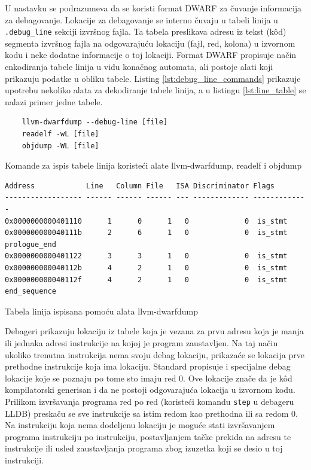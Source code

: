 \documentclass[12pt,oneside]{memoir}
\begin{document}
U nastavku se podrazumeva da se koristi format DWARF za čuvanje informacija za debagovanje.
Lokacije za debagovanje se interno čuvaju u tabeli linija u \verb|.debug_line| sekciji izvršnog fajla.
Ta tabela preslikava adresu iz tekst (k\^od) segmenta izvršnog fajla na odgovarajuću lokaciju (fajl, red, kolona) u izvornom kodu i neke dodatne informacije o toj lokaciji.
Format DWARF propisuje način enkodiranja tabele linija u vidu konačnog automata, ali postoje alati koji prikazuju podatke u obliku tabele.
Listing \ref{lst:debug_line_commands} prikazuje upotrebu nekoliko alata za dekodiranje tabele linija, a u listingu \ref{lst:line_table} se nalazi primer jedne tabele.

\begin{listing}[!ht]
  \begin{verbatim}
    llvm-dwarfdump --debug-line [file]
    readelf -wL [file]
    objdump -WL [file]
  \end{verbatim}
  \caption{Komande za ispis tabele linija koristeći alate llvm-dwarfdump, readelf i objdump}
  \label{lst:debug_line_commands}
\end{listing}

\begin{listing}[!ht]
  \begin{verbatim}
Address            Line   Column File   ISA Discriminator Flags
------------------ ------ ------ ------ --- ------------- -------------
0x0000000000401110      1      0      1   0             0  is_stmt
0x000000000040111b      2      6      1   0             0  is_stmt prologue_end
0x0000000000401122      3      3      1   0             0  is_stmt
0x000000000040112b      4      2      1   0             0  is_stmt
0x000000000040112f      4      2      1   0             0  is_stmt end_sequence
  \end{verbatim}
  \caption{Tabela linija ispisana pomoću alata llvm-dwarfdump}
  \label{lst:line_table}
\end{listing}

Debageri prikazuju lokaciju iz tabele koja je vezana za prvu adresu koja je manja ili jednaka adresi instrukcije na kojoj je program zaustavljen.
Na taj način ukoliko trenutna instrukcija nema svoju debag lokaciju, prikazaće se lokacija prve prethodne instrukcije koja ima lokaciju.
Standard propisuje i specijalne debag lokacije koje se poznaju po tome sto imaju red 0.
Ove lokacije znače da je k\^od kompilatorski generisan i da ne postoji odgovarajuća lokacija u izvornom kodu.
Prilikom izvršavanja programa red po red (koristeći komandu \verb|step| u debageru LLDB) preskaču se sve instrukcije sa istim redom kao prethodna ili sa redom 0. 
Na instrukciju koja nema dodeljenu lokaciju je moguće stati izvršavanjem programa instrukciju po instrukciju, postavljanjem tačke prekida na adresu te instrukcije ili usled zaustavljanja programa zbog izuzetka koji se desio u toj instrukciji.
\end{document}
